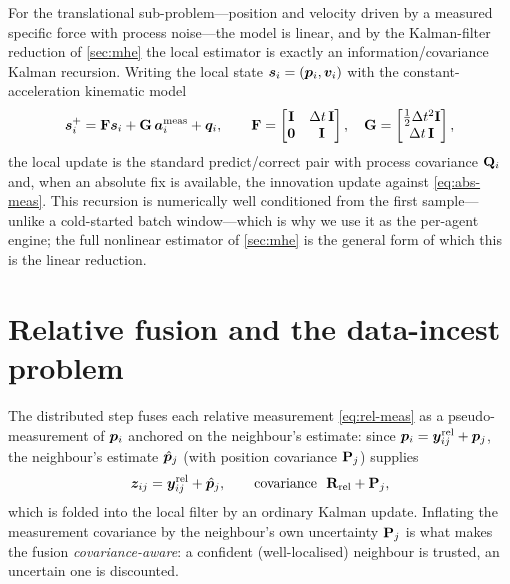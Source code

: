 For the translational sub-problem---position and velocity driven by a measured
specific force with process noise---the model is linear, and by the
Kalman-filter reduction of \cref{sec:mhe} the local estimator is exactly an
information/covariance Kalman recursion. Writing the local state
$\bm{s}_i=(\bm{p}_i,\bm{v}_i)$ with the constant-acceleration kinematic model
\begin{equation}
\bm{s}_i^{+}=\mathbf{F}\bm{s}_i+\mathbf{G}\,\bm{a}_i^{\text{meas}}+\bm{q}_i,
\qquad
\mathbf{F}=\begin{bmatrix}\mathbf{I}&\Delta t\,\mathbf{I}\\\mathbf{0}&\mathbf{I}\end{bmatrix},
\quad
\mathbf{G}=\begin{bmatrix}\tfrac12\Delta t^2\mathbf{I}\\\Delta t\,\mathbf{I}\end{bmatrix},
\label{eq:dmhe-kin}
\end{equation}
the local update is the standard predict/correct pair with process covariance
$\mathbf{Q}_i$ and, when an absolute fix is available, the innovation update against
\cref{eq:abs-meas}. This recursion is numerically well conditioned from the first
sample---unlike a cold-started batch window---which is why we use it as the
per-agent engine; the full nonlinear estimator of \cref{sec:mhe} is the general
form of which this is the linear reduction.

\section{Relative fusion and the data-incest problem}
\label{sec:dmhe-fusion}

The distributed step fuses each relative measurement \cref{eq:rel-meas} as a
pseudo-measurement of $\bm{p}_i$ anchored on the neighbour's estimate: since
$\bm{p}_i=\bm{y}_{ij}^{\text{rel}}+\bm{p}_j$, the neighbour's estimate
$\hat{\bm{p}}_j$ (with position covariance $\mathbf{P}_j$) supplies
\begin{equation}
\bm{z}_{ij}=\bm{y}_{ij}^{\text{rel}}+\hat{\bm{p}}_j,\qquad
\text{covariance }\ \mathbf{R}_{\text{rel}}+\mathbf{P}_j,
\label{eq:pseudo-meas}
\end{equation}
which is folded into the local filter by an ordinary Kalman update. Inflating the
measurement covariance by the neighbour's own uncertainty $\mathbf{P}_j$ is what
makes the fusion \emph{covariance-aware}: a confident (well-localised) neighbour
is trusted, an uncertain one is discounted.

